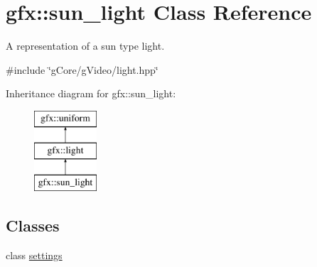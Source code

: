 \hypertarget{classgfx_1_1sun__light}{\section{gfx\-:\-:sun\-\_\-light Class Reference}
\label{classgfx_1_1sun__light}
}


A representation of a sun type light.  




{\ttfamily \#include \char`\"{}g\-Core/g\-Video/light.\-hpp\char`\"{}}

Inheritance diagram for gfx\-:\-:sun\-\_\-light\-:\begin{figure}[H]
\begin{center}
\leavevmode
\includegraphics[height=3.000000cm]{classgfx_1_1sun__light}
\end{center}
\end{figure}
\subsection*{Classes}
\begin{DoxyCompactItemize}
\item 
class \hyperlink{classgfx_1_1sun__light_1_1settings}{settings}
\end{DoxyCompactItemize}

